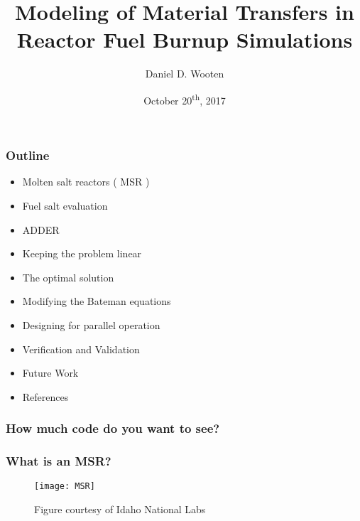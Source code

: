 \documentclass{beamer}
\title[Modeling of Material Transfers in MSRs]{Modeling of Material Transfers in  Reactor Fuel Burnup Simulations}
\author{Daniel D. Wooten}
\institute{UC Berkeley}
\date{October 20\textsuperscript{th}, 2017}
\begin{document}
\frame{\titlepage}

\begin{frame}

\frametitle{Outline}

    \begin{itemize}
        \item Molten salt reactors ( MSR ) 
        \item Fuel salt evaluation 
        \item ADDER
        \item Keeping the problem linear
        \item The optimal solution
        \item Modifying the Bateman equations
        \item Designing for parallel operation
        \item Verification and Validation
        \item Future Work
        \item References
    \end{itemize}

\end{frame}

\begin{frame}
\frametitle{How much code do you want to see?}

\end{frame}

\begin{frame}
\frametitle{What is an MSR?}

    \begin{figure}
        \centering
        \texttt{[image: MSR]}
        \caption{Figure courtesy of Idaho National Labs}
        \label{fig:msr}
    \end{figure}

\end{frame}
\end{document}
